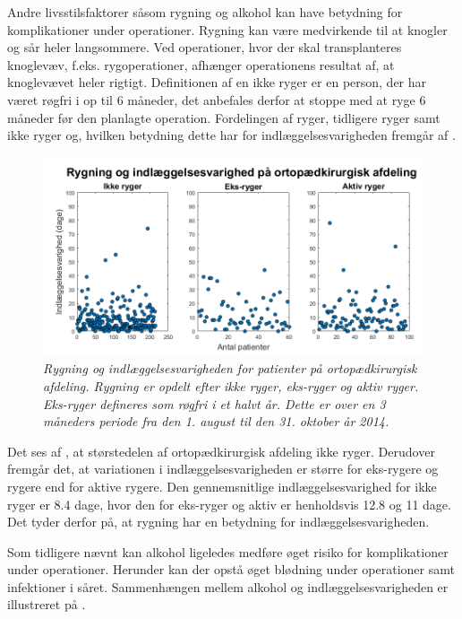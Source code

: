 Andre livsstilsfaktorer såsom rygning og alkohol kan have betydning for komplikationer under operationer. Rygning kan være medvirkende til at knogler og sår heler langsommere. Ved operationer, hvor der skal transplanteres knoglevæv, f.eks. rygoperationer, afhænger operationens resultat af, at knoglevævet heler rigtigt. Definitionen af en ikke ryger er en person, der har været røgfri i op til 6 måneder, det anbefales derfor at stoppe med at ryge 6 måneder før den planlagte operation.\cite{Nordjylland2014} Fordelingen af ryger, tidligere ryger samt ikke ryger og, hvilken betydning dette har for indlæggelsesvarigheden fremgår af .


\begin{figure}[H]
	\centering
	\includegraphics[scale=0.55]{figures/rygerogindlaeg}
	\caption{\textit{Rygning og indlæggelsesvarigheden for patienter på ortopædkirurgisk afdeling. Rygning er opdelt efter ikke ryger, eks-ryger og aktiv ryger. Eks-ryger defineres som røgfri i et halvt år. Dette er over en 3 måneders periode fra den 1. august til den 31. oktober år 2014.}}
	\label{rygningogindlaeggelse}
\end{figure}


\noindent
Det ses af , at størstedelen af ortopædkirurgisk afdeling ikke ryger. Derudover fremgår det, at variationen i indlæggelsesvarigheden er større for eks-rygere og rygere end for aktive rygere. Den gennemsnitlige indlæggelsesvarighed for ikke ryger er 8.4 dage, hvor den for eks-ryger og aktiv er henholdsvis 12.8 og 11 dage. Det tyder derfor på, at rygning har en betydning for indlæggelsesvarigheden.

Som tidligere nævnt kan alkohol ligeledes medføre øget risiko for komplikationer under operationer. Herunder kan der opstå øget blødning under operationer samt infektioner i såret.\cite{Nordjylland2014} Sammenhængen mellem alkohol og indlæggelsesvarigheden er illustreret på  . 


